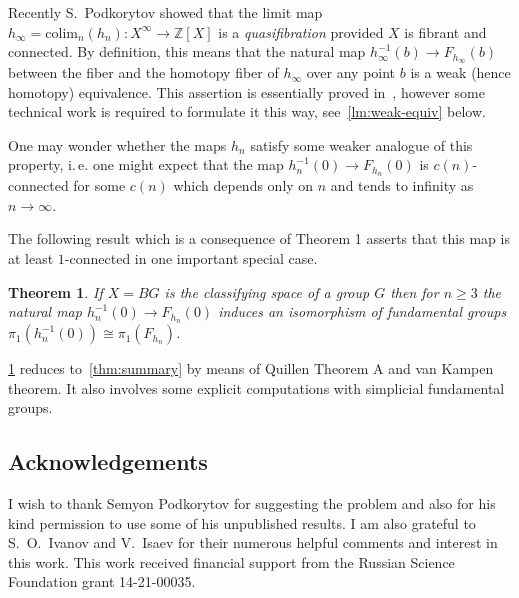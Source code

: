 \documentclass[oneside, 10pt]{amsart}
\theoremstyle{plain}
\newtheorem{thm}{Theorem}
\numberwithin{equation}{section}
\numberwithin{lemma}{section}
\theoremstyle{remark}
\theoremstyle{definition}
\newcommand{\ZZ}{\mathbb{Z}}
\begin{document}
Recently S.~Podkorytov showed that the limit map $h_\infty = \mathrm{colim}_n(h_n) \colon X^\infty \to \ZZ[X]$ is a {\it quasifibration}
 provided $X$ is fibrant and connected.
By definition, this means that the natural map $h^{-1}_\infty(b) \to F_{h_\infty}(b)$ between the fiber and the homotopy fiber of $h_\infty$ over any point $b$ is 
a weak (hence homotopy) equivalence.
This assertion is essentially proved in~\cite[Lemma~9.1]{Po17}, however some technical work is required to
  formulate it this way, see~\cref{lm:weak-equiv} below.

One may wonder whether the maps $h_n$ satisfy some weaker analogue of this property,
 i.\,e. one might expect that the map $h_n^{-1}(0) \to F_{h_n}(0)$ is $c(n)$-connected for some $c(n)$ which depends only on $n$ and tends to infinity as $n\to \infty$.
  
The following result which is a consequence of Theorem 1 asserts that this map is at least $1$-connected in one important special case.
\begin{thm} \label{thm:main} If $X=BG$ is the classifying space of a group $G$ then for $n\geq 3$
 the natural map $h_n^{-1}(0) \to F_{h_n}(0)$ induces an isomorphism of fundamental groups
 $\pi_1(h^{-1}_n(0))\cong \pi_1(F_{h_n})$. \end{thm}
\cref{thm:main} reduces to~\cref{thm:summary} by means of Quillen Theorem A and van Kampen theorem.
It also involves some explicit computations with simplicial fundamental groups.

\subsection{Acknowledgements}
I wish to thank Semyon Podkorytov for suggesting the problem and also for his kind permission to use some of his unpublished results.
I am also grateful to S.~O.~Ivanov and V.~Isaev for their numerous helpful comments and interest in this work.
This work received financial support from the Russian Science Foundation grant 14-21-00035.
\end{document}
